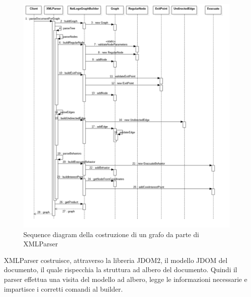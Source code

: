 \begin{figure}[htbp]
\centering
\includegraphics[width=\textwidth,height=\textheight,keepaspectratio]{images/builder-sequence.png}
\caption{Sequence diagram della costruzione di un grafo da parte di XMLParser}
\label{fig:builder-sequence}
\end{figure}
XMLParser costruisce, attraverso la libreria JDOM2, il modello JDOM del documento, il quale rispecchia la struttura ad albero del documento. Quindi il parser effettua una visita del modello ad albero, legge le informazioni necessarie e impartisce i corretti comandi al builder.\\

